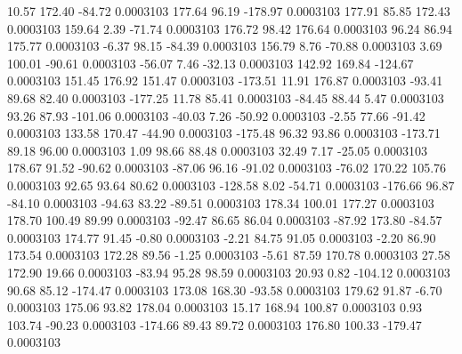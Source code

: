        10.57      172.40      -84.72     0.0003103
      177.64       96.19     -178.97     0.0003103
      177.91       85.85      172.43     0.0003103
      159.64        2.39      -71.74     0.0003103
      176.72       98.42      176.64     0.0003103
       96.24       86.94      175.77     0.0003103
       -6.37       98.15      -84.39     0.0003103
      156.79        8.76      -70.88     0.0003103
        3.69      100.01      -90.61     0.0003103
      -56.07        7.46      -32.13     0.0003103
      142.92      169.84     -124.67     0.0003103
      151.45      176.92      151.47     0.0003103
     -173.51       11.91      176.87     0.0003103
      -93.41       89.68       82.40     0.0003103
     -177.25       11.78       85.41     0.0003103
      -84.45       88.44        5.47     0.0003103
       93.26       87.93     -101.06     0.0003103
      -40.03        7.26      -50.92     0.0003103
       -2.55       77.66      -91.42     0.0003103
      133.58      170.47      -44.90     0.0003103
     -175.48       96.32       93.86     0.0003103
     -173.71       89.18       96.00     0.0003103
        1.09       98.66       88.48     0.0003103
       32.49        7.17      -25.05     0.0003103
      178.67       91.52      -90.62     0.0003103
      -87.06       96.16      -91.02     0.0003103
      -76.02      170.22      105.76     0.0003103
       92.65       93.64       80.62     0.0003103
     -128.58        8.02      -54.71     0.0003103
     -176.66       96.87      -84.10     0.0003103
      -94.63       83.22      -89.51     0.0003103
      178.34      100.01      177.27     0.0003103
      178.70      100.49       89.99     0.0003103
      -92.47       86.65       86.04     0.0003103
      -87.92      173.80      -84.57     0.0003103
      174.77       91.45       -0.80     0.0003103
       -2.21       84.75       91.05     0.0003103
       -2.20       86.90      173.54     0.0003103
      172.28       89.56       -1.25     0.0003103
       -5.61       87.59      170.78     0.0003103
       27.58      172.90       19.66     0.0003103
      -83.94       95.28       98.59     0.0003103
       20.93        0.82     -104.12     0.0003103
       90.68       85.12     -174.47     0.0003103
      173.08      168.30      -93.58     0.0003103
      179.62       91.87       -6.70     0.0003103
      175.06       93.82      178.04     0.0003103
       15.17      168.94      100.87     0.0003103
        0.93      103.74      -90.23     0.0003103
     -174.66       89.43       89.72     0.0003103
      176.80      100.33     -179.47     0.0003103
